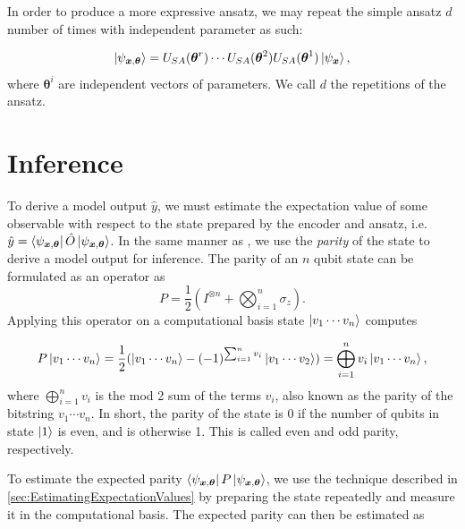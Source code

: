 In order to produce a more expressive ansatz, we may repeat the simple ansatz $d$ number of times with independent parameter as such:

\begin{equation}\label{eq:simple ansatz}
    \ket{\psi_{\boldsymbol{x}, \boldsymbol{\theta}}} = 
    U_{SA}(\boldsymbol{\theta}^r)\cdots U_{SA}(\boldsymbol{\theta}^2) U_{SA}(\boldsymbol{\theta}^1)\ket{\psi_{\boldsymbol{x}}},
\end{equation}
where $\boldsymbol{\theta}^i$ are independent vectors of parameters. We call $d$ the repetitions of the ansatz.

\section{Inference}\label{sec:Inference}
To derive a model output $\hat{y}$, we must estimate the expectation value of some observable with respect to the state prepared by the encoder and ansatz, i.e. $\hat{y} =\bra{\psi_{\boldsymbol{x},\boldsymbol{\theta}}}
\hat{O} 
\ket{\psi_{\boldsymbol{x},\boldsymbol{\theta}}}$. In the same manner as \cite{abbas2020power}, we use the \emph{parity} of the state to derive a model output for inference. The parity of an $n$ qubit state can be formulated as an operator as
\begin{equation}
    P = \frac{1}{2}(I^{\otimes n} + \bigotimes_{i=1}^n \sigma_z).
\end{equation}
Applying this operator on a computational basis state $\ket{v_1  \cdots v_n}$ computes 


\begin{equation}
    P\ket{v_1  \cdots v_n} = 
    \frac{1}{2}(\ket{v_1  \cdots v_n} -(-1)^{\sum_{i=1}^n v_i}\ket{v_1  \cdots v_2}) = 
    \bigoplus_{i=1}^n v_i \ket{v_1  \cdots v_n}, 
\end{equation}
where $\bigoplus_{i=1}^n v_i$ is the mod 2 sum of the terms $v_i$, also known as the parity of the bitstring $v_1\cdots v_n$. In short, the parity of the state is $0$ if the number of qubits in state $\ket{1}$ is even, and is otherwise 1. This is called even and odd parity, respectively. 

To estimate the expected parity $\bra{\psi_{\boldsymbol{x},\boldsymbol{\theta}}}P 
\ket{\psi_{\boldsymbol{x},\boldsymbol{\theta}}}$, we use the technique described in \autoref{sec:EstimatingExpectationValues} by preparing the state repeatedly and measure it in the computational basis. The expected parity can then be estimated as 

